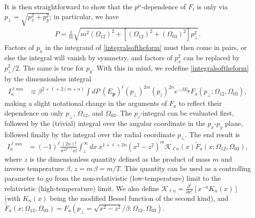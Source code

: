 \documentclass[12pt,aps,prd,nofootinbib,noshowkeys,noshowpacs,longbibliography,
superscriptaddress,tightenlines,floatfix,preprintnumbers]{revtex4-2}
\newcommand{\p}{\partial}
\begin{document}
It is then straightforward to show that the $p^\mu$-dependence of $F_i$ is only via ${p_\perp = \sqrt{p_x^2 + p_y^2}}$; in particular, we have
\begin{align}
    P = \frac{1}{m}\sqrt{m^2 (\Omega_{12})^2 + \left[ (\Omega_{12})^2 + (\Omega_{03})^2\right]p_\perp^2}.
\end{align}
Factors of $p_x$ in the integrand of \eqref{integralsoftheform} must then come in pairs, or else the integral will vanish by symmetry, and factors of $p_x^2$ can be replaced by $p_\perp^2/2$. The same is true for $p_y$. With this in mind, we redefine \eqref{integralsoftheform} by the dimensionless integral
\begin{align} \label{Idef}
    I_a^{\ell mn}&\equiv \beta^{2+\ell+2(m+n)}\int dP\ (E_{\bm p})^\ell (p_\perp)^{2m} (p_z)^{2n} e^{-\beta E_{\bm p}} F_a(p_\perp; \Omega_{12}, \Omega_{03}),
\end{align}
making a slight notational change in the arguments of $F_a$ to reflect their dependence on only $p_\perp$, $\Omega_{12}$, and $\Omega_{03}$. The $p_z$-integral can be evaluated first, followed by the (trivial) integral over the angular coordinate in the $p_x$-$p_y$ plane, followed finally by the integral over the radial coordinate $p_\perp$. The end result is
\begin{align} \label{I}
    I_a^{\ell mn} &= (-1)^\ell \frac{(2n)!}{\pi^22^{n-1} n!}\int_z^\infty dx\ x^{1+\ell + 2n}(x^2-z^2)^m \mathcal K_{\ell n}(x) \tilde F_a(x; \Omega_{12}, \Omega_{03}),
\end{align}
where $z$ is the dimensionless quantity defined as the product of mass $m$ and inverse temperature $\beta$, $z=m\,\beta = m/T$. This quantity can be used as a controlling parameter to go from the non-relativistic (low-temperature) limit to the relativistic (high-temperature) limit. We also define $\mathcal K_{\ell n}=\frac{\p^\ell}{\p x^\ell}\left[ x^{-n}K_n(x)\right]$ (with $K_n(x)$ being the modified Bessel function of the second kind), and $\tilde F_a(x; \Omega_{12}, \Omega_{03})= F_a(p_\perp=\sqrt{x^2-z^2}/\beta; \Omega_{12}, \Omega_{03})$.
\end{document}

